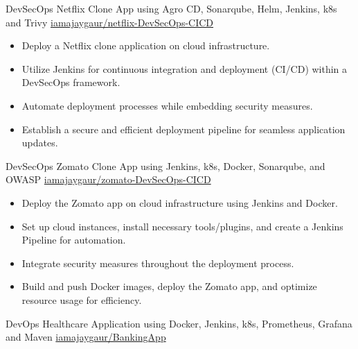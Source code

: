 \documentclass[9pt]{developercv} %
\begin{document}
\begin{entrylist}
    \entry
		{DevSecOps}
		{Netflix Clone App using Agro CD, Sonarqube, Helm, Jenkins, k8s and Trivy \vspace{-8 pt}}                   
		{\href{https://github.com/iamajaygaur/netflix-DevSecOps-CICD.git}{iamajaygaur/netflix-DevSecOps-CICD}}
            {
                \begin{itemize}[noitemsep,topsep=0pt,parsep=0pt,partopsep=0pt, leftmargin=0pt]
                    \item Deploy a Netflix clone application on cloud infrastructure.
                    \item Utilize Jenkins for continuous integration and deployment (CI/CD) within a DevSecOps framework.
                    \item Automate deployment processes while embedding security measures.
                    \item Establish a secure and efficient deployment pipeline for seamless application updates.
                \end{itemize}
            }
    \entry
		{DevSecOps}
		{Zomato Clone App using Jenkins, k8s, Docker, Sonarqube, and OWASP \vspace{-8 pt}}
		{\href{https://github.com/iamajaygaur/zomato-DevSecOps-CICD.git}{iamajaygaur/zomato-DevSecOps-CICD}}
		{
                \begin{itemize}[noitemsep,topsep=0pt,parsep=0pt,partopsep=0pt, leftmargin=0pt]
                    \item Deploy the Zomato app on cloud infrastructure using Jenkins and Docker.
                    \item Set up cloud instances, install necessary tools/plugins, and create a Jenkins Pipeline for automation.
                    \item Integrate security measures throughout the deployment process.
                    \item Build and push Docker images, deploy the Zomato app, and optimize resource usage for efficiency.
                \end{itemize}
            }
	\entry
		{DevOps}
		{Healthcare Application using Docker, Jenkins, k8s, Prometheus, Grafana and Maven \vspace{-8 pt}}
		{\href{https://github.com/iamajaygaur/BankingApp.git}{iamajaygaur/BankingApp}}

\end{entrylist}
\end{document}
